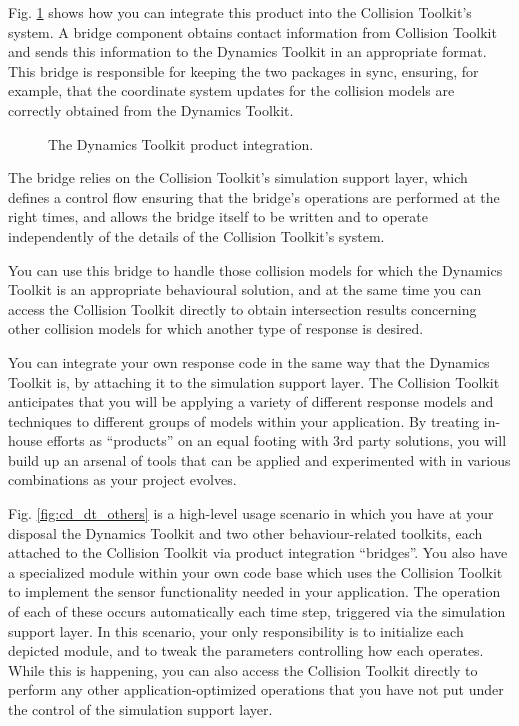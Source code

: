 \documentclass[11pt]{article}
\begin{document}
Fig. \ref{fig:cd_dt} 
shows how you can integrate this product into the Collision Toolkit's system.
A bridge component obtains contact information from Collision Toolkit and sends this
information to the Dynamics Toolkit in an appropriate format. This bridge is responsible
for keeping the two packages in sync, ensuring, for example, that the
coordinate system updates for the collision models are correctly obtained
from the Dynamics Toolkit.

\begin{figure}[h!]
\centerline{}
\caption{ The Dynamics Toolkit product integration.
} 
\label{fig:cd_dt}
\end{figure}

The bridge relies on the Collision Toolkit's simulation support layer,
which defines a control flow ensuring that the bridge's operations are
performed at the right times, and allows the bridge itself to be written
and to operate independently of the details of the Collision Toolkit's system.

You can use this bridge to handle those collision models for which the Dynamics Toolkit
is an appropriate behavioural solution, and at the same time you can access
the Collision Toolkit directly to obtain intersection results concerning other collision
models for which another type of
response is desired.


You can integrate your own response code in the same way that the Dynamics
Toolkit is,
by attaching it to the simulation support layer. 
The Collision Toolkit anticipates that you will be applying a variety of
different response models and techniques to different groups of models
within your application. 
By
treating in-house efforts as ``products'' on an equal footing with 3rd
party solutions, you will build up an arsenal of tools that can
be applied and experimented with in various combinations as your project
evolves.

Fig. \ref{fig:cd_dt_others} is a high-level usage scenario in which you have at your disposal the
Dynamics Toolkit and two other behaviour-related toolkits, each attached to the Collision Toolkit via
product integration ``bridges''. You also have a
specialized module within your own code base which uses the Collision Toolkit to implement
the sensor functionality needed in your application. The operation of each
of these occurs automatically each time step, triggered via the simulation support
layer. In this scenario, your only responsibility is to initialize each
depicted module, and to tweak the parameters controlling how each
operates. While this is happening,
you can also access the Collision Toolkit directly to perform any
other application-optimized operations that you have not put under the control of the simulation support layer.
\end{document}

